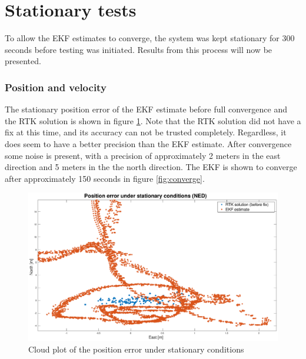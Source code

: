 \section{Stationary tests}
    
    To allow the EKF estimates to converge, the system was kept stationary for 300 seconds before testing was initiated. Results from this process will now be presented.\\
    
    \subsubsection{Position and velocity}
    The stationary position error of the EKF estimate before full convergence and the RTK solution is shown in figure \ref{fig:pos-err-stat}. Note that the RTK solution did not have a fix at this time, and its accuracy can not be trusted completely. Regardless, it does seem to have a better precision than the EKF estimate. After convergence some noise is present, with a precision of approximately 2 meters in the east direction and 5 meters in the the north direction. The EKF is shown to converge after approximately 150 seconds in figure \ref{fig:converge}.\\
    
    \begin{figure}[!htbp]
        \hspace{-1.5cm}
        \includegraphics[scale=0.3]{Results/Images/pos-cloud.eps}
        \caption{Cloud plot of the position error under stationary conditions}
        \label{fig:pos-err-stat}
    \end{figure}
    
